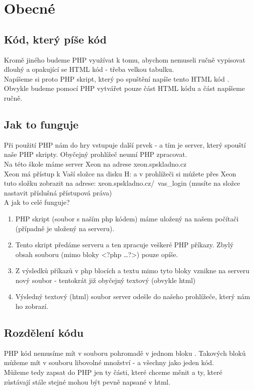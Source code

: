 \section{Obecné}
\subsection{Kód, který píše kód}
Kromě jiného budeme PHP využívat k tomu, abychom nemuseli ručně vypisovat dlouhý a opakující se HTML kód - třeba velkou tabulku.\\
Napíšeme si proto PHP skript, který po spuštění napíše tento HTML kód . Obvykle budeme pomocí PHP vytvářet pouze část HTML kódu a část napíšeme ručně.

\subsection{Jak to funguje}
Při použití PHP nám do hry vstupuje další prvek - a tím je server, který spouští naše PHP skripty. Obyčejný prohlížeč neumí PHP zpracovat.\\
Na této škole máme server Xeon na adrese xeon.spskladno.cz\\
Xeon má přístup k Vaší složce  na disku H: a v prohlížeči si můžete přes Xeon tuto složku zobrazit na adrese: xeon.spskladno.cz/~vas\_login (musíte na složce nastavit příslušná přístupová práva)\\
A jak to celé funguje?\\
\begin{enumerate}
\item PHP skript (soubor s naším php kódem) máme uložený na našem počítači (případně je uložený na serveru). 
\item Tento skript předáme serveru a ten zpracuje veškeré PHP příkazy. Zbylý obsah souboru (mimo bloky <?php \dots ?>) pouze opíše.
\item Z výsledků příkazů v php blocích a textu mimo tyto bloky vznikne na serveru nový soubor - tentokrát již obyčejný textový (obvykle html)
\item Výsledný textový (html) soubor server odešle do našeho prohlížeče, který nám ho zobrazí.
\end{enumerate}

\subsection{Rozdělení kódu}
PHP kód nemusíme mít v souboru pohromadě v jednom bloku . Takových bloků můžeme mít v souboru libovolné množství - a všechny  jako jeden kód.\\
Můžeme tedy zapsat do PHP jen ty části, které chceme měnit a ty, které zůstávají stále stejné mohou být pevně napsané v html.\\

